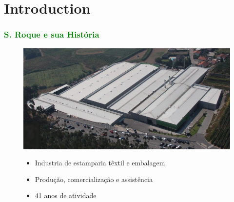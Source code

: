 

\section{Introduction}
\begin{frame}
\frametitle{\textcolor{green}{S. Roque e sua História}}

\begin{figure}[H]

\begin{minipage}{0.45\linewidth}
\includegraphics[scale=0.25]{./image/ROQ/ROQ_Pavilhoes.jpg}
\end{minipage}
\hfill
\begin{minipage}{0.45\linewidth}
\begin{itemize}
\item Industria de estamparia têxtil e embalagem\\
\item Produção, comercialização e assistência\\
\item 41 anos de atividade
\end{itemize}
\end{minipage}

\end{figure}

\end{frame}
